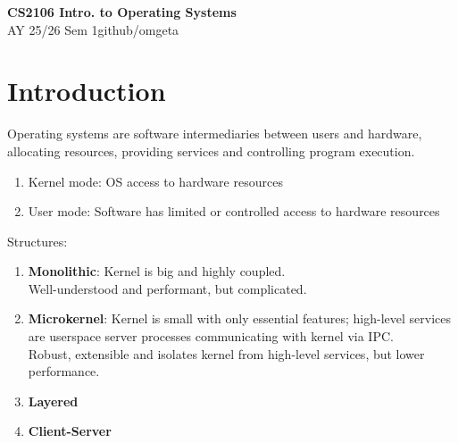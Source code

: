 \documentclass[12pt, a4paper]{article}
\newcommand{\mytitle}{CS2106 Intro. to Operating Systems}
\newcommand{\myauthor}{github/omgeta}
\newcommand{\mydate}{AY 25/26 Sem 1}
\begin{document}
\raggedright
\footnotesize
\begin{multicols*}{3}
\setlength{\premulticols}{1pt}
\setlength{\postmulticols}{1pt}
\setlength{\multicolsep}{1pt}
\setlength{\columnsep}{2pt}

{\normalsize{\textbf{\mytitle}}}\\
{\footnotesize{\mydate\hspace{2pt}\textemdash\hspace{2pt}\myauthor}}
\section{Introduction}
Operating systems are software intermediaries between users and hardware, allocating resources, providing services and controlling program execution. 
\begin{enumerate}[\roman*.]
  \item Kernel mode: OS access to hardware resources
  \item User mode: Software has limited or controlled access to hardware resources
\end{enumerate}

Structures:
\begin{enumerate}[\roman*.]
  \item \textbf{Monolithic}: Kernel is big and highly coupled.\\Well-understood and performant, but complicated. 
    \begin{center}
      \hspace{-1em}
    \end{center}
  \item \textbf{Microkernel}: Kernel is small with only essential features; high-level services are userspace server processes communicating with kernel via IPC.\\Robust, extensible and isolates kernel from high-level services, but lower performance.
    \begin{center}
      \hspace{-1em}
    \end{center}
  \item \textbf{Layered}
  \item \textbf{Client-Server}
\end{enumerate}


\end{multicols*}
\end{document}
